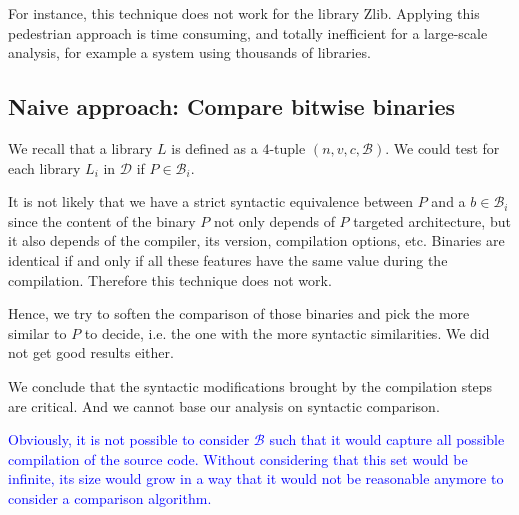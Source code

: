\documentclass{article}
\newcommand{\ludo}[1]{\textcolor{blue}{#1}}
\begin{document}
	For instance, this technique does not work for the library Zlib. Applying this pedestrian approach is time consuming, and totally inefficient for a large-scale analysis, for example a system using thousands of libraries. 

    \subsection{Naive approach: Compare bitwise binaries }
    \label{naive-notations}

   We recall that a library $L$ is defined as a $4$-tuple $(n, v, c, \mathcal{B})$. We could test for each library $L_i$ in $\mathcal{D}$ if $P \in
    \mathcal{B}_i$.

    It is not likely that we have a strict syntactic equivalence between
    $P$ and a $b \in \mathcal{B}_i$ since the content of the binary $P$ not only depends of $P$ targeted architecture, but it also depends of the compiler,
    its version, compilation options, etc. Binaries are identical if and only if all these features have the same value during the compilation. Therefore this technique does not work.


Hence, we try to soften the comparison of those binaries and pick the more similar to $P$ to decide, i.e. the one with the more syntactic similarities. We did not get good results either.

   We conclude that the syntactic modifications brought by the compilation steps are critical. And we cannot base our analysis on syntactic comparison.


%
    
    \ludo{Obviously, it is not possible to consider $\mathcal{B}$ such that it
    would capture all possible compilation of the source code. Without
    considering that this set would be infinite, its size would grow in a way
    that it would not be reasonable anymore to consider a comparison algorithm.}
\end{document}
